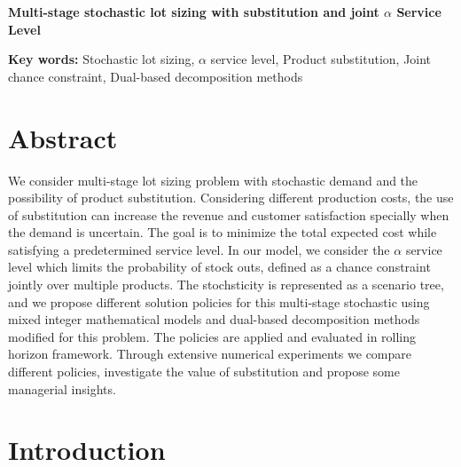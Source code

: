 \documentclass[10pt]{article}
\def\Title#1{\begin{center} {\Large {\bf #1} } \end{center}}
\begin{document}
\Title{Multi-stage stochastic lot sizing with substitution and joint $\alpha$ Service Level }

\bigskip\bigskip









 \textbf{\large Key words:} Stochastic lot sizing, $\alpha$ service level, Product substitution, Joint chance constraint, Dual-based decomposition methods



\section{Abstract}

We consider multi-stage lot sizing problem with stochastic demand and the possibility of product substitution. Considering different production costs, the use of substitution can increase the revenue and customer satisfaction specially when the demand is uncertain. The goal is to minimize the total expected cost while satisfying a predetermined service level. In our model, we consider the $\alpha$ service level which limits the probability of stock outs, defined as a chance constraint jointly over multiple products. The stochsticity is represented as a scenario tree, and we propose different solution policies for this multi-stage stochastic using mixed integer mathematical models and dual-based decomposition methods modified for this problem. The policies are applied and evaluated in rolling horizon framework. Through extensive numerical experiments we compare different policies, investigate the value of substitution and propose some managerial insights. 

\section{Introduction}
\end{document}
